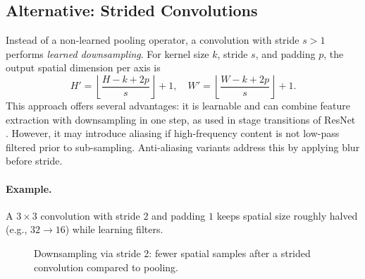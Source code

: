 \subsection{Alternative: Strided Convolutions}
\label{subsec:strided-convs}

Instead of a non-learned pooling operator, a convolution with stride $s>1$ performs \emph{learned downsampling}. For kernel size $k$, stride $s$, and padding $p$, the output spatial dimension per axis is
\begin{equation}
H' = \left\lfloor \frac{H - k + 2p}{s} \right\rfloor + 1,\quad W' = \left\lfloor \frac{W - k + 2p}{s} \right\rfloor + 1.
\end{equation}
This approach offers several advantages: it is learnable and can combine feature extraction with downsampling in one step, as used in stage transitions of ResNet \cite{He2016}. However, it may introduce aliasing if high-frequency content is not low-pass filtered prior to sub-sampling. Anti-aliasing variants address this by applying blur before stride.

\paragraph{Example.} A $3\times3$ convolution with stride $2$ and padding $1$ keeps spatial size roughly halved (e.g., $32\to16$) while learning filters.

\begin{figure}[h]
    \centering
    \caption{Downsampling via stride 2: fewer spatial samples after a strided convolution compared to pooling.}
    \label{fig:strided-conv}
\end{figure}

